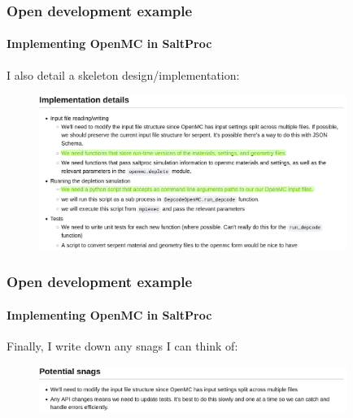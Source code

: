 \begin{frame}[fragile]
    \frametitle{Open development example}
    \framesubtitle{Implementing OpenMC in SaltProc}

    I also detail a skeleton design/implementation:


    \vspace{0.5cm}
    \begin{figure}[htpb]
        \centering
        \includegraphics[width=10cm]{images/open-dev-ex2.png}
    \end{figure}

\end{frame}

\begin{frame}[fragile]
    \frametitle{Open development example}
    \framesubtitle{Implementing OpenMC in SaltProc}

    Finally, I write down any snags I can think of:
    \vspace{0.5cm}
    \begin{figure}[htpb]
        \centering
        \includegraphics[width=10cm]{images/open-dev-ex3.png}
    \end{figure}

\end{frame}

